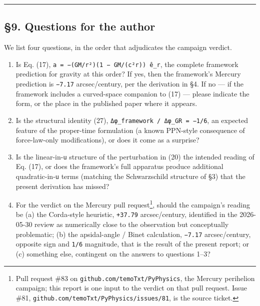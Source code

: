 \documentclass[
  11pt,
]{article}
\begin{document}
\begin{center}\rule{0.5\linewidth}{0.5pt}\end{center}

\hypertarget{questions-for-the-author}{%
\subsection{§9. Questions for the
author}\label{questions-for-the-author}}

We list four questions, in the order that adjudicates the campaign
verdict.

\begin{enumerate}
\def\labelenumi{\arabic{enumi}.}
\item
  Is Eq. (17), \texttt{a\ =\ −(GM/r²)(1\ −\ GM/(c²r))\ ê\_r}, the
  complete framework prediction for gravity at this order? If yes, then
  the framework's Mercury prediction is \texttt{−7.17} arcsec/century,
  per the derivation in §4. If no --- if the framework includes a
  curved-space companion to (17) --- please indicate the form, or the
  place in the published paper where it appears.
\item
  Is the structural identity (27),
  \texttt{Δφ\_framework\ /\ Δφ\_GR\ =\ −1/6}, an expected feature of the
  proper-time formulation (a known PPN-style consequence of
  force-law-only modifications), or does it come as a surprise?
\item
  Is the linear-in-\texttt{u} structure of the perturbation in (20) the
  intended reading of Eq. (17), or does the framework's full apparatus
  produce additional quadratic-in-\texttt{u} terms (matching the
  Schwarzschild structure of §3) that the present derivation has missed?
\item
  For the verdict on the Mercury pull request\footnote{Pull request \#83
    on \texttt{github.com/temoTxt/PyPhysics}, the Mercury perihelion
    campaign; this report is one input to the verdict on that pull
    request. Issue \#81,
    \texttt{github.com/temoTxt/PyPhysics/issues/81}, is the source
    ticket.}, should the campaign's reading be (a) the Corda-style
  heuristic, \texttt{+37.79} arcsec/century, identified in the
  2026-05-30 review as numerically close to the observation but
  conceptually problematic; (b) the apsidal-angle / Binet calculation,
  \texttt{−7.17} arcsec/century, opposite sign and \texttt{1/6}
  magnitude, that is the result of the present report; or (c) something
  else, contingent on the answers to questions 1--3?
\end{enumerate}
\end{document}
